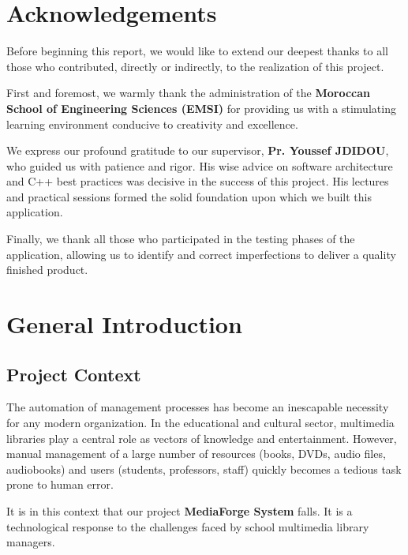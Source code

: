 \documentclass[12pt,a4paper]{report}
\begin{document}
\chapter*{Acknowledgements}

Before beginning this report, we would like to extend our deepest thanks to all those who contributed, directly or indirectly, to the realization of this project.

First and foremost, we warmly thank the administration of the \textbf{Moroccan School of Engineering Sciences (EMSI)} for providing us with a stimulating learning environment conducive to creativity and excellence.

We express our profound gratitude to our supervisor, \textbf{Pr. Youssef JDIDOU}, who guided us with patience and rigor. His wise advice on software architecture and C++ best practices was decisive in the success of this project. His lectures and practical sessions formed the solid foundation upon which we built this application.

Finally, we thank all those who participated in the testing phases of the application, allowing us to identify and correct imperfections to deliver a quality finished product.

\tableofcontents

\listoffigures
{}

\chapter{General Introduction}

\section{Project Context}
The automation of management processes has become an inescapable necessity for any modern organization. In the educational and cultural sector, multimedia libraries play a central role as vectors of knowledge and entertainment. However, manual management of a large number of resources (books, DVDs, audio files, audiobooks) and users (students, professors, staff) quickly becomes a tedious task prone to human error.

It is in this context that our project \textbf{MediaForge System} falls. It is a technological response to the challenges faced by school multimedia library managers.
\end{document}
